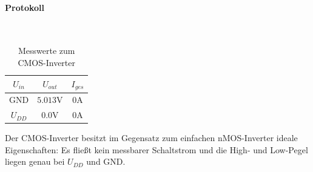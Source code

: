 \documentclass[10pt]{scrreprt}
\begin{document}
    \paragraph{Protokoll}
    $ $
    \begin{table}[H]
        \centering
        \begin{tabular}{ccc}
            \toprule
            $U_{in}$ & $U_{out}$ & $I_{ges}$ \\
            \midrule
            GND & $5.013\si{\volt}$ & $0\si{\ampere}$\\
            $U_{DD}$ & $0.0\si{\volt}$ & $0\si{\ampere}$\\
            \bottomrule
        \end{tabular}
        \caption{Messwerte zum CMOS-Inverter}
    \end{table}

    Der CMOS-Inverter besitzt im Gegensatz zum einfachen nMOS-Inverter ideale
    Eigenschaften: Es fließt kein messbarer Schaltstrom und die High- und Low-Pegel
    liegen genau bei $U_{DD}$ und GND.
\end{document}
